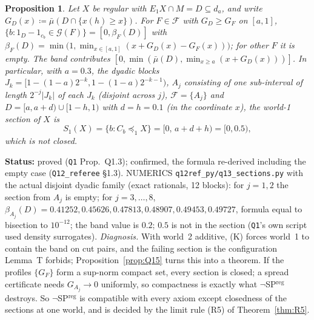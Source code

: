 \documentclass[11pt]{article}
\newtheorem{proposition}[theorem]{Proposition}
\theoremstyle{definition}
\theoremstyle{remark}
\newcommand{\src}[1]{\texttt{#1}}
\newcommand{\status}[1]{\par\smallskip\noindent\textbf{Status:} #1\par\smallskip}
\begin{document}
\begin{proposition}\label{prop:Q13}
Let $X$ be regular with $E_1X\cap M=D\subseteq d_a$, and write $G_D(x)\coloneqq\bar\mu(D\cap\{x(h)\ge x\})$. For $F\in\mathcal F$ with $G_D\ge G_F$ on $[a,1]$, $\{b:1_D-1_{c_b}\in\mathcal G(F)\}=[0,\beta_F(D)]$ with $\beta_F(D)=\min\bigl(1,\min_{x\in[a,1]}(x+G_D(x)-G_F(x))\bigr)$; for other $F$ it is empty. The band contributes $[0,\min(\bar\mu(D),\min_{x\ge a}(x+G_D(x)))]$. In particular, with $a=0.3$, the dyadic blocks $J_k=[1-(1-a)2^{-k},1-(1-a)2^{-k-1})$, $A_j$ consisting of one sub-interval of length $2^{-j}|J_k|$ of each $J_k$ (disjoint across $j$), $\mathcal F=\{A_j\}$ and $D=[a,a+d)\cup[1-h,1)$ with $d=h=0.1$ (in the coordinate $x$), the world-1 section of $X$ is
\[
S_1(X)=\{b:C_b\preceq_1X\}=[0,\,a+d+h)=[0,0.5),
\]
which is not closed.
\end{proposition}
\status{proved (\src{Q1} Prop.~Q1.3); confirmed, the formula re-derived including the empty case (\src{Q12\_referee} \S1.3). NUMERICS \src{q12ref\_py/q13\_sections.py} with the actual disjoint dyadic family (exact rationals, 12 blocks): for $j=1,2$ the section from $A_j$ is empty; for $j=3,\dots,8$, $\beta_{A_j}(D)=0.41252,0.45626,0.47813,0.48907,0.49453,0.49727$, formula equal to bisection to $10^{-12}$; the band value is $0.2$; $0.5$ is not in the section (\src{Q1}'s own script used density surrogates). \emph{Diagnosis.} With world~2 additive, (K) forces world~1 to contain the band on cut pairs, and the failing section is the configuration Lemma~T forbids; Proposition~\ref{prop:Q15} turns this into a theorem. If the profiles $\{G_F\}$ form a sup-norm compact set, every section is closed; a spread certificate needs $G_{A_j}\to0$ uniformly, so compactness is exactly what $\neg$SP$^{\mathrm{reg}}$ destroys. So $\neg$SP$^{\mathrm{reg}}$ is compatible with every axiom except closedness of the sections at one world, and is decided by the limit rule (R5) of Theorem~\ref{thm:R5}.}
\end{document}
